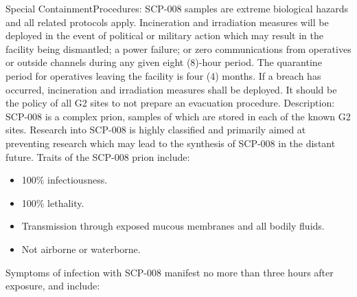Special Containment\linebreak Procedures: SCP-008 samples are extreme biological hazards and all related protocols apply. Incineration and irradiation measures will be deployed in the event of political or military action which may result in the facility being dismantled; a power failure; or zero communications from operatives or outside channels during any given eight (8)-hour period. The quarantine period for operatives leaving the facility is four (4) months. If a breach has occurred, incineration and irradiation measures shall be deployed. It should be the policy of all G2 sites to not prepare an evacuation procedure.
Description: SCP-008 is a complex prion, samples of which are stored in each of the known G2 sites. Research into SCP-008 is highly classified and primarily aimed at preventing research which may lead to the synthesis of SCP-008 in the distant future. Traits of the SCP-008 prion include:
\begin{itemize}
\item 100\% infectiousness.
\item 100\% lethality.
\item Transmission through exposed mucous membranes and all bodily fluids.
\item Not airborne or waterborne.
\end{itemize}
Symptoms of infection with SCP-008 manifest no more than three hours after exposure, and include:
